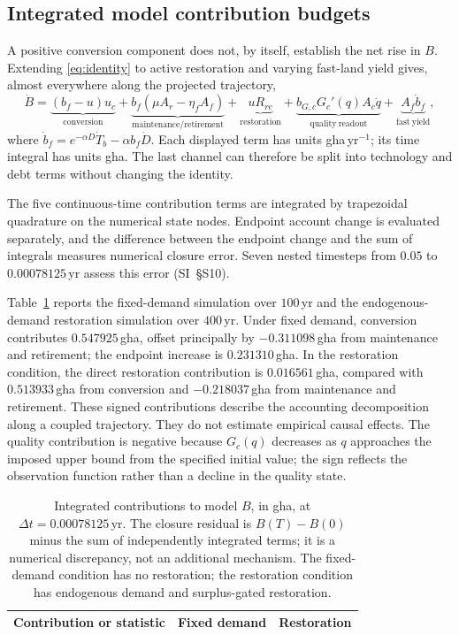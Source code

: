 \documentclass[preprint,12pt,authoryear]{elsarticle}
\begin{document}
\subsection{Integrated model contribution budgets}\label{sec:c13budget}

A positive conversion component does not, by itself, establish the net rise in $B$. Extending \eqref{eq:identity} to active restoration and varying fast-land yield gives, almost everywhere along the projected trajectory,
\begin{equation}\label{eq:c13fullbudget}
\dot B=\underbrace{(b_f-u)u_c}_{\mathrm{conversion}}+
\underbrace{b_f(\mu A_r-\eta_fA_f)}_{\mathrm{maintenance/retirement}}+
\underbrace{uR_{rc}}_{\mathrm{restoration}}+
\underbrace{b_{G,c}G_c'(q)A_c\dot q}_{\mathrm{quality\ readout}}+
\underbrace{A_f\dot b_f}_{\mathrm{fast\ yield}},
\end{equation}
where $\dot b_f=e^{-\alpha D}\dot T_b-\alpha b_f\dot D$. Each displayed term has units gha\,yr$^{-1}$; its time integral has units gha. The last channel can therefore be split into technology and debt terms without changing the identity.

The five continuous-time contribution terms are integrated by trapezoidal quadrature on the numerical state nodes. Endpoint account change is evaluated separately, and the difference between the endpoint change and the sum of integrals measures numerical closure error. Seven nested timesteps from $0.05$ to $0.00078125$\,yr assess this error (SI~\S S10).

Table~\ref{tab:c13budget} reports the fixed-demand simulation over $100$\,yr and the endogenous-demand restoration simulation over $400$\,yr. Under fixed demand, conversion contributes $0.547925$\,gha, offset principally by $-0.311098$\,gha from maintenance and retirement; the endpoint increase is $0.231310$\,gha. In the restoration condition, the direct restoration contribution is $0.016561$\,gha, compared with $0.513933$\,gha from conversion and $-0.218037$\,gha from maintenance and retirement. These signed contributions describe the accounting decomposition along a coupled trajectory. They do not estimate empirical causal effects. The quality contribution is negative because $G_c(q)$ decreases as $q$ approaches the imposed upper bound from the specified initial value; the sign reflects the observation function rather than a decline in the quality state.

\begin{table}[htbp]
\centering\small
\caption{Integrated contributions to model $B$, in gha, at $\Delta t=0.00078125$\,yr. The closure residual is $B(T)-B(0)$ minus the sum of independently integrated terms; it is a numerical discrepancy, not an additional mechanism. The fixed-demand condition has no restoration; the restoration condition has endogenous demand and surplus-gated restoration.}
\label{tab:c13budget}
\begin{tabular}{lrr}
\toprule
Contribution or statistic & Fixed demand & Restoration \\
\midrule

\end{tabular}
\end{table}
\end{document}
